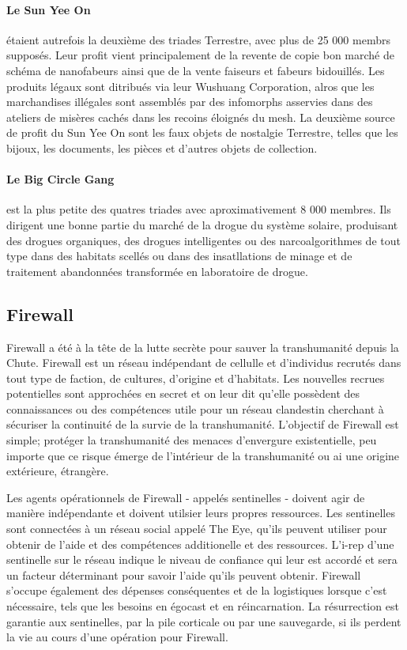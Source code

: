 \paragraph{Le Sun Yee On} \label{sec:sun-yee} étaient autrefois la deuxième des triades Terrestre, avec plus de 25 000 membrs supposés. Leur profit vient principalement de la revente de copie bon marché de schéma de nanofabeurs ainsi que de la vente faiseurs et fabeurs bidouillés. Les produits légaux sont ditribués via leur Wushuang Corporation, alros que les marchandises illégales sont assemblés par des infomorphs asservies dans des ateliers de misères cachés dans les recoins éloignés du mesh. La deuxième source de profit du Sun Yee On sont les faux objets de nostalgie Terrestre, telles que les bijoux, les documents, les pièces et d'autres objets de collection. 

\paragraph{Le Big Circle Gang} \label{sec:big-circle-gang} est la plus petite des quatres triades avec aproximativement 8 000 membres. Ils dirigent une bonne partie du marché de la drogue du système solaire, produisant des drogues organiques, des drogues intelligentes ou des narcoalgorithmes de tout type dans des habitats scellés ou dans des insatllations de minage et de traitement abandonnées transformée en laboratoire de drogue. 

\subsection{Firewall} \label{sec:firewall} 

Firewall a été à la tête de la lutte secrète pour sauver la transhumanité depuis la Chute. Firewall est un réseau indépendant de cellulle et d'individus recrutés dans tout type de faction, de cultures, d'origine et d'habitats. Les nouvelles recrues potentielles sont approchées en secret et on leur dit qu'elle possèdent des connaissances ou des compétences utile pour un réseau clandestin cherchant à sécuriser la continuité de la survie de la transhumanité. L'objectif de Firewall est simple; protéger la transhumanité des menaces d'envergure existentielle, peu importe que ce risque émerge de l'intérieur de la transhumanité ou ai une origine extérieure, étrangère. 

Les agents opérationnels de Firewall - appelés sentinelles - doivent agir de manière indépendante et doivent utilsier leurs propres ressources. Les sentinelles sont connectées à un réseau social appelé The Eye, qu'ils peuvent utiliser pour obtenir de l'aide et des compétences additionelle et des ressources. L'i-rep d'une sentinelle sur le réseau indique le niveau de confiance qui leur est accordé et sera un facteur déterminant pour savoir l'aide qu'ils peuvent obtenir. Firewall s'occupe également des dépenses conséquentes et de la logistiques lorsque c'est nécessaire, tels que les besoins en égocast et en réincarnation. La résurrection est garantie aux sentinelles, par la pile corticale ou par une sauvegarde, si ils perdent la vie au cours d'une opération pour Firewall. 

